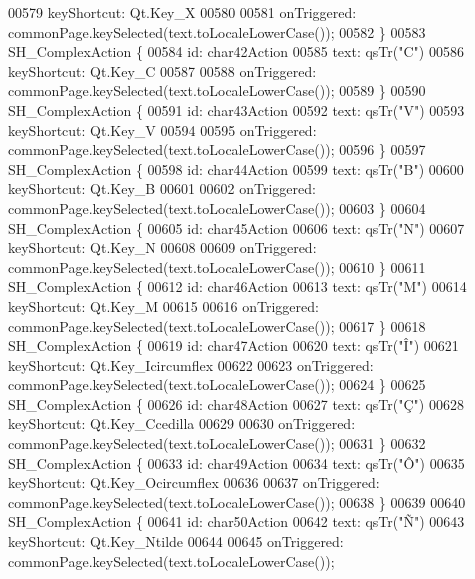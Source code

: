 \begin{DoxyCode}
00579         keyShortcut: Qt.Key\_X
00580 
00581         onTriggered: commonPage.keySelected(text.toLocaleLowerCase());
00582     \}
00583     SH\_ComplexAction \{
00584         \textcolor{keywordtype}{id}: char42Action
00585         text: qsTr(\textcolor{stringliteral}{"C"})
00586         keyShortcut: Qt.Key\_C
00587 
00588         onTriggered: commonPage.keySelected(text.toLocaleLowerCase());
00589     \}
00590     SH\_ComplexAction \{
00591         \textcolor{keywordtype}{id}: char43Action
00592         text: qsTr(\textcolor{stringliteral}{"V"})
00593         keyShortcut: Qt.Key\_V
00594 
00595         onTriggered: commonPage.keySelected(text.toLocaleLowerCase());
00596     \}
00597     SH\_ComplexAction \{
00598         \textcolor{keywordtype}{id}: char44Action
00599         text: qsTr(\textcolor{stringliteral}{"B"})
00600         keyShortcut: Qt.Key\_B
00601 
00602         onTriggered: commonPage.keySelected(text.toLocaleLowerCase());
00603     \}
00604     SH\_ComplexAction \{
00605         \textcolor{keywordtype}{id}: char45Action
00606         text: qsTr(\textcolor{stringliteral}{"N"})
00607         keyShortcut: Qt.Key\_N
00608 
00609         onTriggered: commonPage.keySelected(text.toLocaleLowerCase());
00610     \}
00611     SH\_ComplexAction \{
00612         \textcolor{keywordtype}{id}: char46Action
00613         text: qsTr(\textcolor{stringliteral}{"M"})
00614         keyShortcut: Qt.Key\_M
00615 
00616         onTriggered: commonPage.keySelected(text.toLocaleLowerCase());
00617     \}
00618     SH\_ComplexAction \{
00619         \textcolor{keywordtype}{id}: char47Action
00620         text: qsTr(\textcolor{stringliteral}{"Î"})
00621         keyShortcut: Qt.Key\_Icircumflex
00622 
00623         onTriggered: commonPage.keySelected(text.toLocaleLowerCase());
00624     \}
00625     SH\_ComplexAction \{
00626         \textcolor{keywordtype}{id}: char48Action
00627         text: qsTr(\textcolor{stringliteral}{"Ç"})
00628         keyShortcut: Qt.Key\_Ccedilla
00629 
00630         onTriggered: commonPage.keySelected(text.toLocaleLowerCase());
00631     \}
00632     SH\_ComplexAction \{
00633         \textcolor{keywordtype}{id}: char49Action
00634         text: qsTr(\textcolor{stringliteral}{"Ô"})
00635         keyShortcut: Qt.Key\_Ocircumflex
00636 
00637         onTriggered: commonPage.keySelected(text.toLocaleLowerCase());
00638     \}
00639 
00640     SH\_ComplexAction \{
00641         \textcolor{keywordtype}{id}: char50Action
00642         text: qsTr(\textcolor{stringliteral}{"Ñ"})
00643         keyShortcut: Qt.Key\_Ntilde
00644 
00645         onTriggered: commonPage.keySelected(text.toLocaleLowerCase());

\end{DoxyCode}
